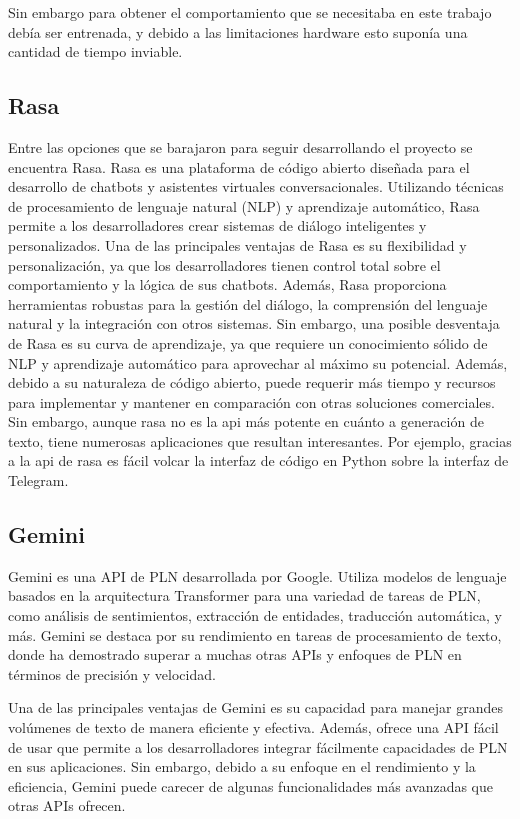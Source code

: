 Sin embargo para obtener el comportamiento que se necesitaba en este trabajo debía ser entrenada, y debido a las limitaciones hardware esto suponía una cantidad de tiempo inviable. 

\subsection{Rasa}
Entre las opciones que se barajaron para seguir desarrollando el proyecto se encuentra Rasa. Rasa es una plataforma de código abierto diseñada para el desarrollo de chatbots y asistentes virtuales conversacionales. Utilizando técnicas de procesamiento de lenguaje natural (NLP) y aprendizaje automático, Rasa permite a los desarrolladores crear sistemas de diálogo inteligentes y personalizados. Una de las principales ventajas de Rasa es su flexibilidad y personalización, ya que los desarrolladores tienen control total sobre el comportamiento y la lógica de sus chatbots. Además, Rasa proporciona herramientas robustas para la gestión del diálogo, la comprensión del lenguaje natural y la integración con otros sistemas. Sin embargo, una posible desventaja de Rasa es su curva de aprendizaje, ya que requiere un conocimiento sólido de NLP y aprendizaje automático para aprovechar al máximo su potencial. Además, debido a su naturaleza de código abierto, puede requerir más tiempo y recursos para implementar y mantener en comparación con otras soluciones comerciales. Sin embargo, aunque rasa no es la api más potente en cuánto a generación de texto, tiene numerosas aplicaciones que resultan interesantes. Por ejemplo, gracias a la api de rasa es fácil volcar la interfaz de código en Python sobre la interfaz de Telegram. 

\subsection{Gemini}


Gemini es una API de PLN desarrollada por Google. Utiliza modelos de lenguaje basados en la arquitectura Transformer para una variedad de tareas de PLN, como análisis de sentimientos, extracción de entidades, traducción automática, y más. Gemini se destaca por su rendimiento en tareas de procesamiento de texto, donde ha demostrado superar a muchas otras APIs y enfoques de PLN en términos de precisión y velocidad.

Una de las principales ventajas de Gemini es su capacidad para manejar grandes volúmenes de texto de manera eficiente y efectiva. Además, ofrece una API fácil de usar que permite a los desarrolladores integrar fácilmente capacidades de PLN en sus aplicaciones. Sin embargo, debido a su enfoque en el rendimiento y la eficiencia, Gemini puede carecer de algunas funcionalidades más avanzadas que otras APIs ofrecen.

